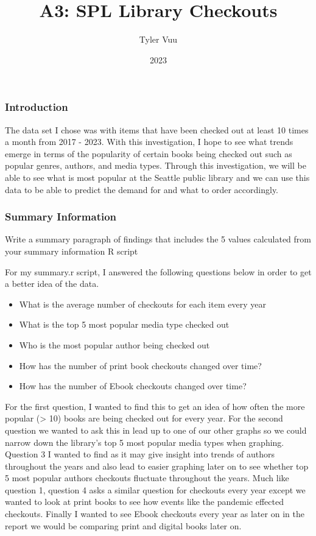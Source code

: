\documentclass[
]{article}
\title{A3: SPL Library Checkouts}
\author{Tyler Vuu}
\date{2023}
\providecommand{\tightlist}{%
  \setlength{\itemsep}{0pt}\setlength{\parskip}{0pt}}
\begin{document}
\maketitle

\hypertarget{introduction}{%
\subsubsection{Introduction}\label{introduction}}

The data set I chose was with items that have been checked out at least
10 times a month from 2017 - 2023. With this investigation, I hope to
see what trends emerge in terms of the popularity of certain books being
checked out such as popular genres, authors, and media types. Through
this investigation, we will be able to see what is most popular at the
Seattle public library and we can use this data to be able to predict
the demand for and what to order accordingly.

\hypertarget{summary-information}{%
\subsubsection{Summary Information}\label{summary-information}}

Write a summary paragraph of findings that includes the 5 values
calculated from your summary information R script

For my summary.r script, I answered the following questions below in
order to get a better idea of the data.

\begin{itemize}
\tightlist
\item
  What is the average number of checkouts for each item every year
\item
  What is the top 5 most popular media type checked out
\item
  Who is the most popular author being checked out
\item
  How has the number of print book checkouts changed over time?
\item
  How has the number of Ebook checkouts changed over time?
\end{itemize}

For the first question, I wanted to find this to get an idea of how
often the more popular (\textgreater{} 10) books are being checked out
for every year. For the second question we wanted to ask this in lead up
to one of our other graphs so we could narrow down the library's top 5
most popular media types when graphing. Question 3 I wanted to find as
it may give insight into trends of authors throughout the years and also
lead to easier graphing later on to see whether top 5 most popular
authors checkouts fluctuate throughout the years. Much like question 1,
question 4 asks a similar question for checkouts every year except we
wanted to look at print books to see how events like the pandemic
effected checkouts. Finally I wanted to see Ebook checkouts every year
as later on in the report we would be comparing print and digital books
later on.
\end{document}
